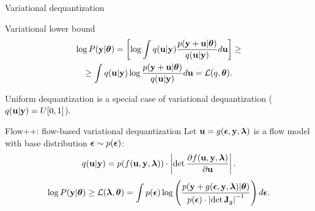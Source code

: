 \begin{frame}{Variational dequantization}
	\vspace{-0.2cm}
	\begin{block}{Variational lower bound}
		\vspace{-0.7cm}
		\begin{multline*}
			\log P(\mathbf{y} | \boldsymbol{\theta}) = \left[ \log \int q(\mathbf{u} | \mathbf{y}) \frac{p(\mathbf{y} + \mathbf{u} | \boldsymbol{\theta})}{q(\mathbf{u} | \mathbf{y})} d \mathbf{u} \right] \geq \\ 
			\geq  \int q(\mathbf{u} | \mathbf{y}) \log \frac{p(\mathbf{y} + \mathbf{u} | \boldsymbol{\theta})}{q(\mathbf{u} | \mathbf{y})} d \mathbf{u} = \mathcal{L}(q, \boldsymbol{\theta}).
		\end{multline*}
		\vspace{-0.6cm}
	\end{block}
	Uniform dequantization is a special case of variational dequantization ($q(\mathbf{u} | \mathbf{y}) = U[0, 1]$).
	\begin{block}{Flow++: flow-based variational dequantization}
		Let $\mathbf{u} = g(\boldsymbol{\epsilon}, \mathbf{y}, \boldsymbol{\lambda})$ is a flow model with base distribution $\boldsymbol{\epsilon} \sim p(\boldsymbol{\epsilon})$:
		\vspace{-0.3cm}
		\[
		q(\mathbf{u} | \mathbf{y}) = p(f(\mathbf{u}, \mathbf{y}, \boldsymbol{\lambda})) \cdot \left| \det \frac{\partial f(\mathbf{u}, \mathbf{y}, \boldsymbol{\lambda})}{\partial \mathbf{u}}\right|.
		\]
		\vspace{-0.3cm}
		\[
		\log P(\mathbf{y} | \boldsymbol{\theta}) \geq \mathcal{L}(\boldsymbol{\lambda}, \boldsymbol{\theta}) = \int p(\boldsymbol{\epsilon}) \log \left( \frac{p(\mathbf{y} + g(\boldsymbol{\epsilon}, \mathbf{y}, \boldsymbol{\lambda}) | \boldsymbol{\theta})}{p(\boldsymbol{\epsilon}) \cdot \left| \det \mathbf{J}_g\right|^{-1}} \right) d\boldsymbol{\epsilon}.
		\]
		\vspace{-0.3cm}
	\end{block}
\end{frame}
